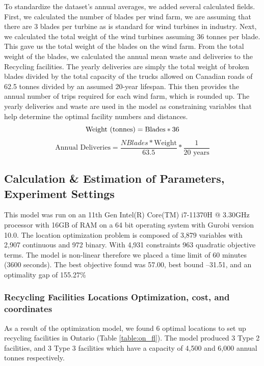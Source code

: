 To standardize the dataset’s annual averages, we added several calculated fields. First, we calculated the number of blades per wind farm, we are assuming that there are 3 blades per turbine as is standard for wind turbines in industry. Next, we calculated the total weight of the wind turbines assuming 36 tonnes per blade. This gave us the total weight of the blades on the wind farm. From the total weight of the blades, we calculated the annual mean waste and deliveries to the Recycling facilities. The yearly deliveries are simply the total weight of broken blades divided by the total capacity of the trucks allowed on Canadian roads of 62.5 tonnes divided by an assumed 20-year lifespan. This then provides the annual number of trips required for each wind farm, which is rounded up. The yearly deliveries and waste are used in the model as constraining variables that help determine the optimal facility numbers and distances. 
\begin{equation}
    \text{Weight (tonnes)} = \text{Blades} * 36 \\
\end{equation}
\begin{equation}
    \text{Annual Deliveries} = \frac{NBlades *\text{Weight}}{63.5} * \frac{1}{\text{20 years}}
\end{equation}


\subsection{Calculation \& Estimation of Parameters, Experiment Settings}
This model was run on an 11th Gen Intel(R) Core(TM) i7-11370H @ 3.30GHz processor with 16GB of RAM on a 64 bit operating system with Gurobi version 10.0. The location optimization problem is composed of 3,879 variables with 2,907 continuous and 972 binary. With 4,931 constraints 963 quadratic objective terms. The model is non-linear therefore we placed a time limit of 60 minutes (3600 seconds). The best objective found was 57.00, best bound –31.51, and an optimality gap of 155.27\%   

\subsubsection{Recycling Facilities Locations Optimization, cost, and coordinates}
As a result of the optimization model, we found 6 optimal locations to set up recycling facilities in Ontario (Table \ref{table:on_fl}). The model produced 3 Type 2 facilities, and 3 Type 3 facilities which have a capacity of 4,500 and 6,000 annual tonnes respectively.  

